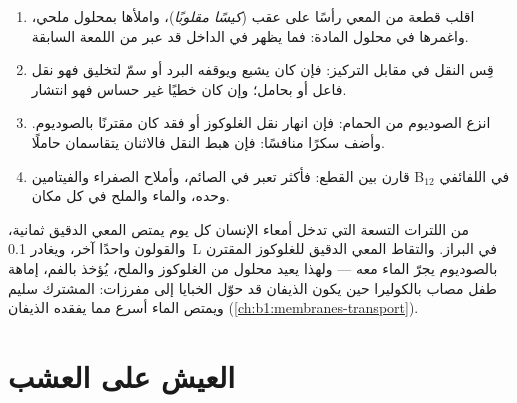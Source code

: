 \begin{method}\label{met:b1:digestion-absorption:everted}
\begin{enumerate}
  \item اقلب قطعة من المعي رأسًا على عقب (\emph{كيسًا مقلوبًا})،
        واملأها بمحلول ملحي، واغمرها في محلول المادة: فما يظهر في
        الداخل قد عبر  من اللمعة السابقة.
  \item قِس النقل في مقابل التركيز: فإن كان يشبع ويوقفه البرد أو
        سمّ لتخليق  فهو نقل فاعل أو بحامل؛ وإن كان خطيًا غير
        حساس فهو انتشار.
  \item انزع الصوديوم من الحمام: فإن انهار نقل الغلوكوز أو  فقد كان مقترنًا بالصوديوم. وأضف سكرًا منافسًا: فإن
        هبط النقل فالاثنان يتقاسمان حاملًا.
  \item قارن بين القطع: فأكثر   تعبر في
        الصائم، وأملاح الصفراء والفيتامين B$_{12}$ في اللفائفي
        وحده، والماء والملح في كل مكان.
\end{enumerate}
\end{method}

\begin{example}\label{ex:b1:digestion-absorption:water}
من اللترات التسعة التي تدخل أمعاء الإنسان كل يوم يمتص المعي الدقيق
ثمانية، والقولون واحدًا آخر، ويغادر \qty{0.1}{L} في البراز. والتقاط
المعي الدقيق للغلوكوز المقترن بالصوديوم يجرّ الماء معه --- ولهذا
يعيد محلول من الغلوكوز والملح، يُؤخذ بالفم، إماهة طفل مصاب
بالكوليرا حين يكون الذيفان قد حوّل الخبايا إلى مفرزات: 
المشترك سليم ويمتص الماء أسرع مما يفقده الذيفان
(\cref{ch:b1:membranes-transport}).
\end{example}

\section{العيش على العشب}

